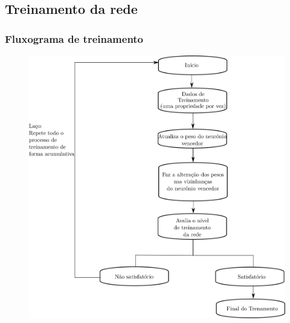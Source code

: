 \documentclass[aspectratio=10]{beamer} %
\begin{document}
\subsection{Treinamento da rede}
\begin{frame}
\frametitle{Fluxograma de treinamento}
\begin{scriptsize}


\begin{figure}[H]
\centering

\includegraphics[scale=0.35]{Imagens/treinamento.png}
\end{figure}
\end{scriptsize}
\end{frame}
\end{document}
